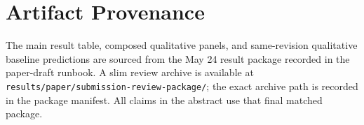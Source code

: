 \documentclass[10pt]{article}
\begin{document}



\appendix
\section{Artifact Provenance}

The main result table, composed qualitative panels, and same-revision
qualitative baseline predictions are sourced from the May 24 result package
recorded in the paper-draft runbook. A slim review archive is available at
\texttt{results/paper/submission-review-package/}; the exact archive path is
recorded in the package manifest. All claims in the abstract use that final
matched package.
\end{document}
